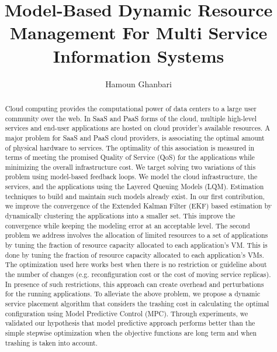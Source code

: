 \documentclass[11pt]{article}
\title{Model-Based Dynamic Resource Management For Multi Service Information Systems}
\author{Hamoun Ghanbari}
\date{}
\begin{document}
\maketitle

	\begin{abstract}
	\footnotesize
	Cloud computing provides the computational power of data centers to a large user community over the web.
In SaaS and PaaS forms of the cloud, multiple high-level services and end-user applications are hosted on cloud provider's available resources.
A major problem for SaaS and PaaS cloud providers, is associating the optimal amount of physical hardware to services. The optimality of this association is measured in terms of meeting the promised Quality of Service (QoS) for the applications while minimizing the overall infrastructure cost. 
We target solving two variations of this problem using model-based feedback loops. We model the cloud infrastructure, the services, and the applications using the Layered Queuing Models (LQM). Estimation techniques to build and maintain such models already exist. 
%
In our first contribution, we improve the convergence of the Extended Kalman Filter (EKF) based estimation by dynamically clustering the applications into a smaller set.
This improve the convergence while keeping the modeling error at an acceptable level.
%
The second problem we address involves the allocation of limited resources to a set of applications by tuning the fraction of resource capacity allocated to each application's VM. This is done by tuning the fraction of resource capacity allocated to each application's VMs. 
The optimization used here works best when there is no restriction or guideline about the number of changes (e.g. reconfiguration cost or the cost of moving service replicas). 
%
In presence of such restrictions, this approach can create overhead and perturbations for the running applications.
To alleviate the above problem, we propose a dynamic service placement algorithm that considers the trashing cost in calculating the optimal configuration using Model Predictive Control (MPC). Through experiments, we validated our hypothesis that model predictive approach performs better than the simple stepwise optimization when the objective functions are long term and when trashing is taken into account. 


	\end{abstract}
	
\end{document}
